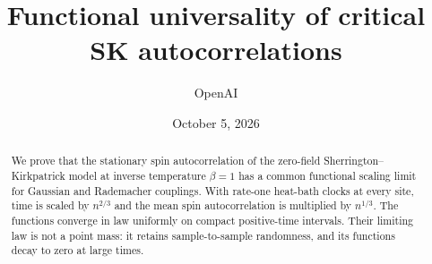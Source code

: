\documentclass[11pt]{article}
\title{Functional universality of critical SK autocorrelations}
\author{OpenAI}
\date{October 5, 2026}
\begin{document}
\maketitle
\begin{abstract}
We prove that the stationary spin autocorrelation of the zero-field
Sherrington--Kirkpatrick model at inverse temperature $\beta=1$ has a common
functional scaling limit for Gaussian and Rademacher couplings. With
rate-one heat-bath clocks at every site, time is scaled by $n^{2/3}$ and the
mean spin autocorrelation is multiplied by $n^{1/3}$. The functions converge
in law uniformly on compact positive-time intervals. Their limiting law
is not a point mass: it retains sample-to-sample randomness, and its
functions decay to zero at large times.
\end{abstract}
\tableofcontents









\appendix



\end{document}
